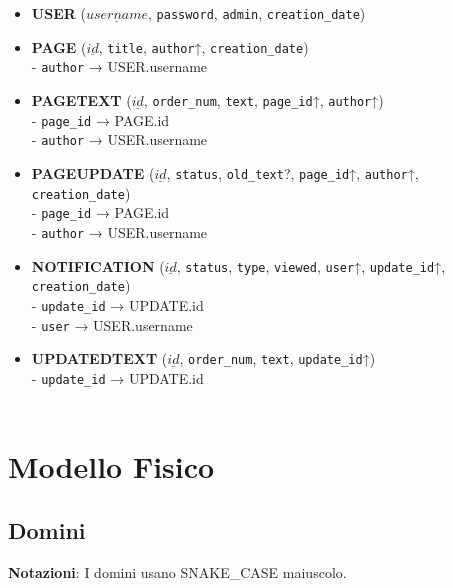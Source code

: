 \documentclass{article}
\begin{document}
	\begin{itemize}
		\item \textbf{USER} ($\underline{username}$, \texttt{password}, \texttt{admin}, \texttt{creation\_date})
		
		\item \textbf{PAGE} ($\underline{id}$, \texttt{title}, \texttt{author}↑, \texttt{creation\_date})
		\\
		- \texttt{author} → USER.username
		
		\item \textbf{PAGETEXT} ($\underline{id}$, \texttt{order\_num}, \texttt{text}, \texttt{page\_id}↑, \texttt{author}↑)
		\\
		- \texttt{page\_id} → PAGE.id	
		\\
		- \texttt{author} → USER.username
		
		\item \textbf{PAGEUPDATE} ($\underline{id}$, \texttt{status}, \texttt{old\_text}?, \texttt{page\_id}↑, \texttt{author}↑, \texttt{creation\_date})
		\\
		- \texttt{page\_id} → PAGE.id
		\\
		- \texttt{author} → USER.username
		
		\item \textbf{NOTIFICATION} ($\underline{id}$, \texttt{status}, \texttt{type}, \texttt{viewed}, \texttt{user}↑, \texttt{update\_id}↑, \texttt{creation\_date})
		\\
		- \texttt{update\_id} → UPDATE.id
		\\
		- \texttt{user} → USER.username
		
		\item \textbf{UPDATEDTEXT} ($\underline{id}$, \texttt{order\_num}, \texttt{text}, \texttt{update\_id}↑)
		\\
		- \texttt{update\_id} → UPDATE.id
		\\\\
	\end{itemize}
	
	
	\newpage
	
	\section{Modello Fisico}
	\subsection{Domini}
	\textbf{Notazioni}: I domini usano SNAKE\_CASE maiuscolo.
	\\
		
\end{document}
